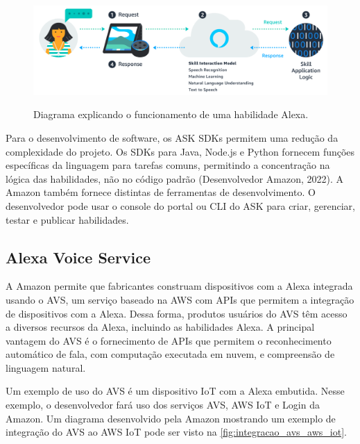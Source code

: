 \begin{figure}[htbp]
	\centering
	\caption{Diagrama explicando o funcionamento de uma habilidade Alexa.}
	\includegraphics[scale=0.35]{Imagens/diagrama_habilidades_alexa.png}
	\label{fig:diagrama_habilidades_alexa}
\end{figure}

Para o desenvolvimento de software, os ASK SDKs permitem uma redução da complexidade do projeto. Os SDKs para Java, Node.js e Python fornecem funções específicas da linguagem para tarefas comuns, permitindo a concentração na lógica das habilidades, não no código padrão (Desenvolvedor Amazon, 2022). A Amazon também fornece distintas de ferramentas de desenvolvimento. O desenvolvedor pode usar o console do portal ou CLI do ASK para criar, gerenciar, testar e publicar habilidades.

\subsection{Alexa Voice Service}\label{subsection:alexa_voice_service}

A Amazon permite que fabricantes construam dispositivos com a Alexa integrada usando o AVS, um serviço baseado na AWS com APIs que permitem a integração de dispositivos com a Alexa. Dessa forma, produtos usuários do AVS têm acesso a diversos recursos da Alexa, incluindo as habilidades Alexa. A principal vantagem do AVS é o fornecimento de APIs que permitem o reconhecimento automático de fala, com computação executada em nuvem, e compreensão de linguagem natural.

Um exemplo de uso do AVS é um dispositivo IoT com a Alexa embutida. Nesse exemplo, o desenvolvedor fará uso dos serviços AVS, AWS IoT e Login da Amazon. Um diagrama desenvolvido pela Amazon mostrando um exemplo de integração do AVS ao AWS IoT pode ser visto na \autoref{fig:integracao_avs_aws_iot}.

